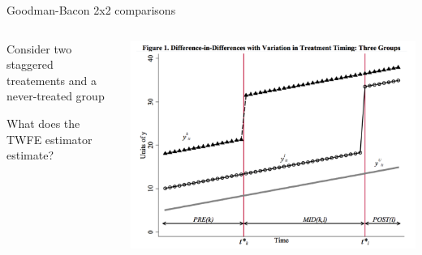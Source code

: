 \documentclass[notes,11pt, aspectratio=169]{beamer}
\newenvironment{wideitemize}{\itemize\addtolength{\itemsep}{10pt}}{\enditemize}
\begin{document}
\begin{frame}{Goodman-Bacon 2x2 comparisons}
  \begin{columns}[T] %
    \begin{column}{0.4\textwidth}
      \begin{wideitemize}
      \item  Consider two staggered treatements and a never-treated group
      \item What does the TWFE estimator estimate?
      \end{wideitemize}
    \end{column}%
    \hfill%
    \begin{column}{.6\textwidth}
      \includegraphics[width=\linewidth]{images/bacon_1.pdf}
    \end{column}%
  \end{columns}
\end{frame}
\end{document}
